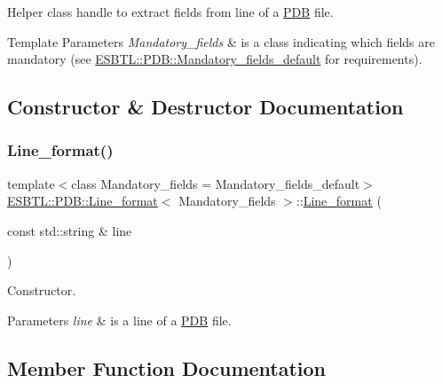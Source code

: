 Helper class handle to extract fields from line of a \hyperlink{namespaceESBTL_1_1PDB}{P\+DB} file. 
\begin{DoxyTemplParams}{Template Parameters}
{\em Mandatory\+\_\+fields} & is a class indicating which fields are mandatory (see \hyperlink{structESBTL_1_1PDB_1_1Mandatory__fields__default}{E\+S\+B\+T\+L\+::\+P\+D\+B\+::\+Mandatory\+\_\+fields\+\_\+default} for requirements). \\
\hline
\end{DoxyTemplParams}


\subsection{Constructor \& Destructor Documentation}
\mbox{\label{classESBTL_1_1PDB_1_1Line__format_aaec07c0a69d03b66c4e9e1662f1cadc9}} 
\subsubsection{\texorpdfstring{Line\+\_\+format()}{Line\_format()}}
{\footnotesize\ttfamily template$<$class Mandatory\+\_\+fields  = Mandatory\+\_\+fields\+\_\+default$>$ \\
\hyperlink{classESBTL_1_1PDB_1_1Line__format}{E\+S\+B\+T\+L\+::\+P\+D\+B\+::\+Line\+\_\+format}$<$ Mandatory\+\_\+fields $>$\+::\hyperlink{classESBTL_1_1PDB_1_1Line__format}{Line\+\_\+format} (\begin{DoxyParamCaption}\item[{const std\+::string \&}]{line }\end{DoxyParamCaption})\hspace{0.3cm}{\ttfamily [inline]}}

Constructor. 
\begin{DoxyParams}{Parameters}
{\em line} & is a line of a \hyperlink{namespaceESBTL_1_1PDB}{P\+DB} file. \\
\hline
\end{DoxyParams}


\subsection{Member Function Documentation}
\mbox{\label{classESBTL_1_1PDB_1_1Line__format_a6e389e51c1fc77585024b0cf9f2f4b66}} 
